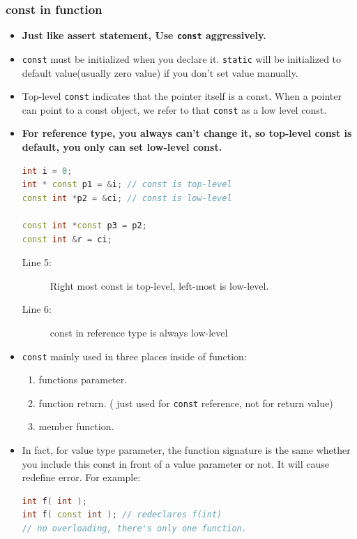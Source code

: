 \documentclass[a4paper,11pt,twoside]{book}
\begin{document}
\subsubsection{const in function}
\begin{itemize}
	\item \textbf{Just like assert statement, Use \texttt{const} aggressively.}
	
	\item \texttt{const} must be initialized when you declare it. \texttt{static} will be initialized to default value(usually zero value) if you don't set value manually. 
	
	\item Top-level \texttt{const} indicates that the pointer itself is a const. When a pointer can point to a const object, we refer to that \texttt{const} as a low level const.
	
	\item \textbf{For reference type, you always can't change it, so top-level const is default, you only can set low-level const.}
\begin{lstlisting}[frame=single, language=c++]
int i = 0;
int * const p1 = &i; // const is top-level
const int *p2 = &ci; // const is low-level
	
const int *const p3 = p2;
const int &r = ci;
\end{lstlisting}
\begin{description}
	\item[Line 5:] Right most const is top-level, left-most is low-level.
	\item[Line 6:] const in reference type is always low-level
\end{description}
	
	\item \texttt{const} mainly used in three places inside of function:
	\begin{enumerate}
		\item functions parameter.
		\item function return. ( just used for \texttt{const} reference, not for return value)
		\item member function.
	\end{enumerate}
	
	\item In fact, for value type parameter, the function signature is the same whether you include this const in front of a value parameter or not. It will cause redefine error. For example:
\begin{lstlisting}[frame=single, language=c++]
int f( int );
int f( const int ); // redeclares f(int)
// no overloading, there's only one function.
\end{lstlisting}
	

\end{itemize}
\end{document}

